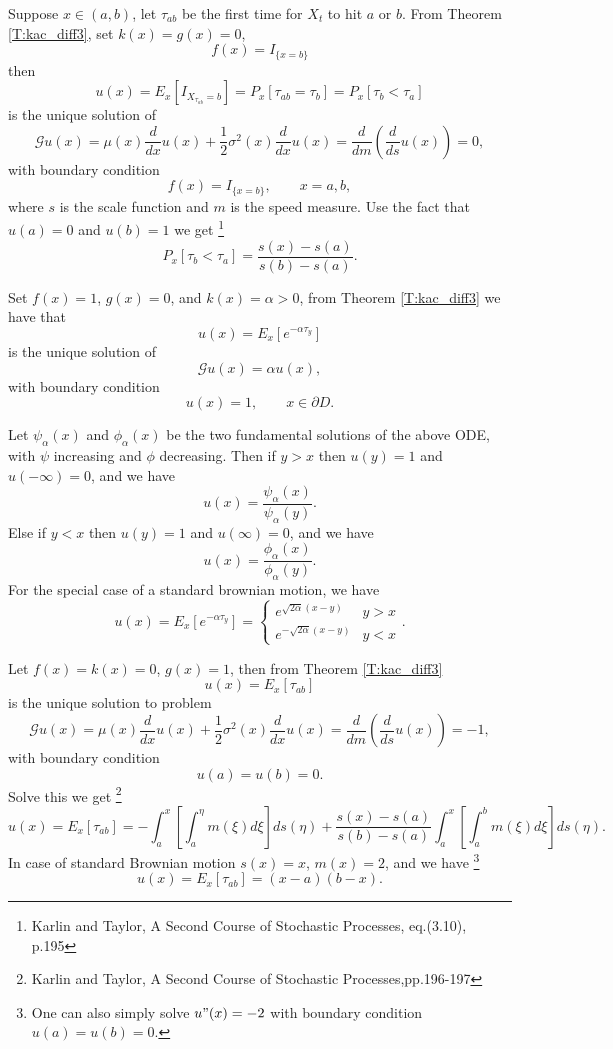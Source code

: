 \begin{example}
Suppose $x\in (a,b)$, let $\tau_{ab}$ be the first time for $X_t$ to hit $a$ 
or $b$. From Theorem \ref{T:kac_diff3}, set $k(x)=g(x)=0$, 
\[
  f(x)=I_{ \{ x=b \} }
\]
then 
\[
  u(x) = E_x[ I_{X_{\tau_{ab}}=b} ] = P_x[\tau_{ab}=\tau_b] 
       = P_x[\tau_b<\tau_a]
\]
is the unique solution of
\[
  \mathcal{G} u(x)  
    = \mu(x) \frac{d}{dx} u(x) + \frac{1}{2} \sigma^2(x) \frac{d}{dx} u(x)
    = \frac{d}{dm} \left( \frac{d}{ds} u(x) \right)
    = 0,
\]
with boundary condition 
\[
  f(x)=I_{ \{ x=b \} }, \qquad x=a,b,
\]
where $s$ is the scale function and $m$ is the speed measure.
Use the fact that $u(a)=0$ and $u(b)=1$ we get
\footnote{Karlin and Taylor, A Second Course of Stochastic Processes, 
  eq.(3.10), p.195}
\begin{equation}
  P_x[\tau_b<\tau_a] = \frac{s(x)-s(a)}{s(b)-s(a)}.
\end{equation}
\end{example}


\begin{example} \label{Ex:hit2}
Set $f(x)=1$, $g(x)=0$, and $k(x)=\alpha>0$, from Theorem \ref{T:kac_diff3}
we have that
\[
  u(x) = E_x[e^{-\alpha \tau_y}]
\]
is the unique solution of
\[
  \mathcal{G} u(x) = \alpha u(x),
\]
with boundary condition
\[
  u(x)=1, \qquad x\in \partial D.
\]

Let $\psi_{\alpha}(x)$ and $\phi_{\alpha}(x)$ be the two fundamental solutions
of the above ODE, with $\psi$ increasing and $\phi$ decreasing. Then if
$y>x$ then $u(y)=1$ and $u(-\infty)=0$, and we have
\[
	u(x)=\frac{\psi_{\alpha}(x)}{\psi_{\alpha}(y)}.
\]
Else if $y<x$ then $u(y)=1$ and $u(\infty)=0$, and we have
\[
	u(x)=\frac{\phi_{\alpha}(x)}{\phi_{\alpha}(y)}.
\]
For the special case of a standard brownian motion, we have
\[
  u(x)= E_x[e^{-\alpha \tau_y}]
    = \begin{cases}
        e^{\sqrt{2\alpha}(x-y)}     &  y>x  \\
        e^{-\sqrt{2\alpha}(x-y)}    &  y<x
      \end{cases}.
\]
\end{example}

\begin{example}
Let $f(x)=k(x)=0$, $g(x)=1$, then from Theorem \ref{T:kac_diff3}
\[
  u(x)=E_x[\tau_{ab}] 
\]
is the unique solution to problem
\[
  \mathcal{G} u(x)  
    = \mu(x) \frac{d}{dx} u(x) + \frac{1}{2} \sigma^2(x) \frac{d}{dx} u(x)
    = \frac{d}{dm} \left( \frac{d}{ds} u(x) \right)
    = -1,
\]
with boundary condition
\[
  u(a)=u(b)=0.
\]
Solve this we get
\footnote{Karlin and Taylor, A Second Course of Stochastic Processes,pp.196-197}
\[
  u(x) = E_x[\tau_{ab}] = -\int_a^x [\int_a^{\eta} m(\xi)d\xi] ds(\eta)
        + \frac{s(x)-s(a)}{s(b)-s(a)}  \int_a^x [\int_a^b m(\xi)d\xi] ds(\eta).
\]
In case of standard Brownian motion $s(x)=x$, $m(x)=2$, and we have
\footnote{One can also simply solve $u"(x)=-2$ with boundary condition 
  $u(a)=u(b)=0$.}
\[
  u(x) = E_x[\tau_{ab}] = (x-a)(b-x).
\]
\end{example}

